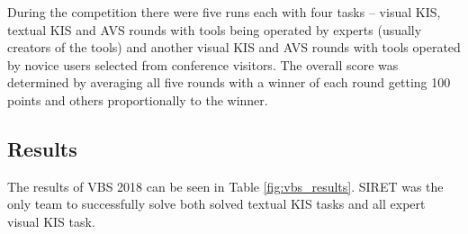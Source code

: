 During the competition there were five runs each with four tasks -- visual KIS, textual KIS and AVS rounds with tools being operated by experts (usually creators of the tools) and another visual KIS and AVS rounds with tools operated by novice users selected from conference visitors. The overall score was determined by averaging all five rounds with a winner of each round getting 100 points and others proportionally to the winner.

\subsection{Results}
The results of VBS 2018 can be seen in Table \ref{fig:vbs_results}. SIRET was the only team to successfully solve both solved textual KIS tasks and all expert visual KIS task.

